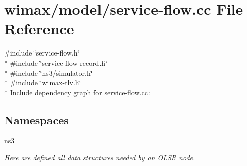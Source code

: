 \hypertarget{service-flow_8cc}{}\section{wimax/model/service-\/flow.cc File Reference}
\label{service-flow_8cc}
{\ttfamily \#include \char`\"{}service-\/flow.\+h\char`\"{}}\\*
{\ttfamily \#include \char`\"{}service-\/flow-\/record.\+h\char`\"{}}\\*
{\ttfamily \#include \char`\"{}ns3/simulator.\+h\char`\"{}}\\*
{\ttfamily \#include \char`\"{}wimax-\/tlv.\+h\char`\"{}}\\*
Include dependency graph for service-\/flow.cc\+:
\subsection*{Namespaces}
\begin{DoxyCompactItemize}
\item 
 \hyperlink{namespacens3}{ns3}
\begin{DoxyCompactList}\small\item\em Here are defined all data structures needed by an O\+L\+SR node. \end{DoxyCompactList}\end{DoxyCompactItemize}

